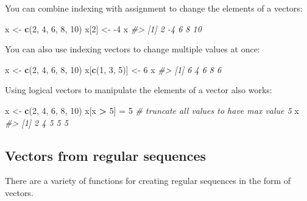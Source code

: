 \documentclass[]{book}
\newenvironment{Shaded}{\begin{snugshade}}{\end{snugshade}}
\newcommand{\CommentTok}[1]{\textcolor[rgb]{0.56,0.35,0.01}{\textit{#1}}}
\newcommand{\DecValTok}[1]{\textcolor[rgb]{0.00,0.00,0.81}{#1}}
\newcommand{\KeywordTok}[1]{\textcolor[rgb]{0.13,0.29,0.53}{\textbf{#1}}}
\newcommand{\NormalTok}[1]{#1}
\newcommand{\OperatorTok}[1]{\textcolor[rgb]{0.81,0.36,0.00}{\textbf{#1}}}
\newcommand{\StringTok}[1]{\textcolor[rgb]{0.31,0.60,0.02}{#1}}
\theoremstyle{definition}
\theoremstyle{definition}
\theoremstyle{definition}
\theoremstyle{remark}
\begin{document}
You can combine indexing with assignment to change the elements of a
vectors:

\begin{Shaded}
\begin{Highlighting}[]
\NormalTok{x <-}\StringTok{ }\KeywordTok{c}\NormalTok{(}\DecValTok{2}\NormalTok{, }\DecValTok{4}\NormalTok{, }\DecValTok{6}\NormalTok{, }\DecValTok{8}\NormalTok{, }\DecValTok{10}\NormalTok{)}
\NormalTok{x[}\DecValTok{2}\NormalTok{] <-}\StringTok{ }\DecValTok{-4} 
\NormalTok{x}
\CommentTok{#> [1]  2 -4  6  8 10}
\end{Highlighting}
\end{Shaded}

You can also use indexing vectors to change multiple values at once:

\begin{Shaded}
\begin{Highlighting}[]
\NormalTok{x <-}\StringTok{ }\KeywordTok{c}\NormalTok{(}\DecValTok{2}\NormalTok{, }\DecValTok{4}\NormalTok{, }\DecValTok{6}\NormalTok{, }\DecValTok{8}\NormalTok{, }\DecValTok{10}\NormalTok{)}
\NormalTok{x[}\KeywordTok{c}\NormalTok{(}\DecValTok{1}\NormalTok{, }\DecValTok{3}\NormalTok{, }\DecValTok{5}\NormalTok{)]  <-}\StringTok{ }\DecValTok{6}
\NormalTok{x}
\CommentTok{#> [1] 6 4 6 8 6}
\end{Highlighting}
\end{Shaded}

Using logical vectors to manipulate the elements of a vector also works:

\begin{Shaded}
\begin{Highlighting}[]
\NormalTok{x <-}\StringTok{ }\KeywordTok{c}\NormalTok{(}\DecValTok{2}\NormalTok{, }\DecValTok{4}\NormalTok{, }\DecValTok{6}\NormalTok{, }\DecValTok{8}\NormalTok{, }\DecValTok{10}\NormalTok{)}
\NormalTok{x[x }\OperatorTok{>}\StringTok{ }\DecValTok{5}\NormalTok{] =}\StringTok{ }\DecValTok{5}    \CommentTok{# truncate all values to have max value 5}
\NormalTok{x}
\CommentTok{#> [1] 2 4 5 5 5}
\end{Highlighting}
\end{Shaded}

\hypertarget{vectors-from-regular-sequences}{%
\subsection{Vectors from regular
sequences}\label{vectors-from-regular-sequences}}

There are a variety of functions for creating regular sequences in the
form of vectors.
\end{document}
